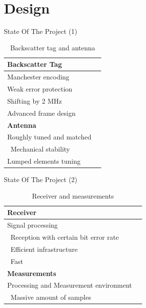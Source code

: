\documentclass[apectratio=169]{beamer}
\begin{document}
\section{Design}
\begin{frame}{State Of The Project (1)}
	\begin{table}[]
	\centering
	\begin{tabular}{ll}
	\hline
	\textbf{Backscatter Tag}               &    \\\hline
	Manchester encoding                    &   \checkmark \\
	Weak error protection                  &   \checkmark\\
	Shifting by 2 MHz                      &   \checkmark\\
	Advanced frame design                  &   \checkmark\\
	\hline
	\textbf{Antenna}                       &    \\\hline
	Roughly tuned and matched              &    \checkmark\\\
	Mechanical stability                   &    \\
	Lumped elements tuning                 &    \\\hline
	\end{tabular}
	\caption{Backscatter tag and antenna}
	\end{table}
\end{frame}
\begin{frame}{State Of The Project (2)}
	\begin{table}[]
	\centering
	\begin{tabular}{ll}
	\hline
	\textbf{Receiver}                      &    \\\hline
	Signal processing                      &    \checkmark\\\
	Reception with certain bit error rate  &    \checkmark\\\
	Efficient infrastructure               &    \checkmark\\\
	Fast				       &    \\\hline
	\textbf{Measurements}                  &    \\\hline
	Processing and Measurement environment &    \checkmark\\\
	Massive amount of samples              &    \\\hline
	\end{tabular}
	\caption{Receiver and measurements}
	\end{table}
\end{frame}
\end{document}
